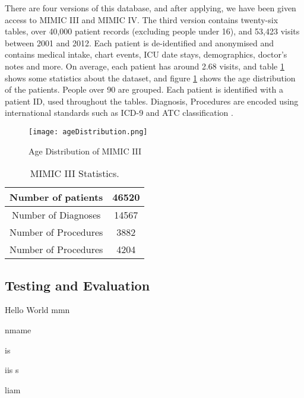 There are four versions of this database, and after applying, we have been
given access to MIMIC III and MIMIC IV. The third version contains twenty-six
tables, over 40,000 patient records (excluding people under 16), and 53,423
visits between 2001 and 2012. Each patient is de-identified and anonymised and
contains medical intake, chart events, ICU date stays, demographics, doctor's
notes and more. On average, each patient has around 2.68 visits, and table \ref{age}
shows some statistics about the dataset, and figure \ref{statistics} shows the age
distribution of the patients. People over 90 are grouped. Each patient is
identified with a patient ID, used throughout the tables. Diagnosis, Procedures
are encoded using international standards such as ICD-9 and ATC classification .

\begin{figure}[h]
    \texttt{[image: ageDistribution.png]}
    \caption{Age Distribution of MIMIC III}
    \label{age}
\end{figure}


\begin{table}[h]

    \caption{MIMIC III Statistics.}
    \label{statistics}
\begin{center}
\begin{tabular}{ | c | c | }
    \hline
 Number of patients     & 46520 \\ 
    \hline
 Number of Diagnoses    & 14567 \\  
    \hline
 Number of Procedures   & 3882 \\
    \hline
 Number of Procedures   & 4204  \\
    \hline
\end{tabular}
\end{center}

    \end{table}


\subsection{Testing and Evaluation}
Hello World mmn

nmame 

is 

iis s 


liam
